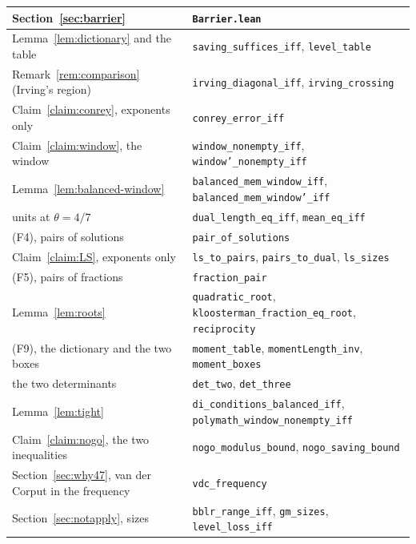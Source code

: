 \documentclass[11pt]{amsart}
\theoremstyle{definition}
\theoremstyle{remark}
\numberwithin{equation}{section}
\begin{document}
\medskip
\begin{center}
\begin{tabular}{ll}
Section~\ref{sec:barrier} & \texttt{Barrier.lean} \\ \hline
Lemma~\ref{lem:dictionary} and the table & \texttt{saving\_suffices\_iff}, \texttt{level\_table}\\
Remark~\ref{rem:comparison} (Irving's region) & \texttt{irving\_diagonal\_iff}, \texttt{irving\_crossing}\\
Claim~\ref{claim:conrey}, exponents only & \texttt{conrey\_error\_iff}\\
Claim~\ref{claim:window}, the window & \texttt{window\_nonempty\_iff}, \texttt{window'\_nonempty\_iff}\\
Lemma~\ref{lem:balanced-window} & \texttt{balanced\_mem\_window\_iff}, \texttt{balanced\_mem\_window'\_iff}\\
units at $\theta=4/7$ & \texttt{dual\_length\_eq\_iff}, \texttt{mean\_eq\_iff}\\
(F4), pairs of solutions & \texttt{pair\_of\_solutions}\\
Claim~\ref{claim:LS}, exponents only & \texttt{ls\_to\_pairs}, \texttt{pairs\_to\_dual}, \texttt{ls\_sizes}\\
(F5), pairs of fractions & \texttt{fraction\_pair}\\
Lemma~\ref{lem:roots} & \texttt{quadratic\_root}, \texttt{kloosterman\_fraction\_eq\_root}, \texttt{reciprocity}\\
(F9), the dictionary and the two boxes & \texttt{moment\_table}, \texttt{momentLength\_inv}, \texttt{moment\_boxes}\\
the two determinants & \texttt{det\_two}, \texttt{det\_three}\\
Lemma~\ref{lem:tight} & \texttt{di\_conditions\_balanced\_iff}, \texttt{polymath\_window\_nonempty\_iff}\\
Claim~\ref{claim:nogo}, the two inequalities & \texttt{nogo\_modulus\_bound}, \texttt{nogo\_saving\_bound}\\
Section~\ref{sec:why47}, van der Corput in the frequency & \texttt{vdc\_frequency}\\
Section~\ref{sec:notapply}, sizes & \texttt{bblr\_range\_iff}, \texttt{gm\_sizes}, \texttt{level\_loss\_iff}
\end{tabular}
\end{center}
\medskip
\end{document}
